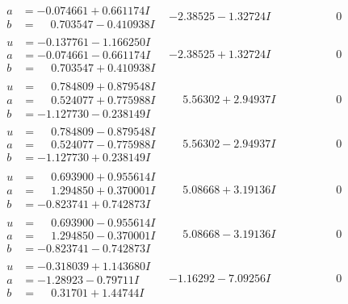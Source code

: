 \documentclass[1p]{elsarticle_modified}
\theoremstyle{definition}
\begin{document}
$$\begin{array}{c|c|c}
\begin{aligned}
a &= -0.074661 + 0.661174 I \\
b &= \phantom{-}0.703547 - 0.410938 I\end{aligned}
 & -2.38525 - 1.32724 I & \phantom{-0.000000 } 0 \\ \hline\begin{aligned}
u &= -0.137761 - 1.166250 I \\
a &= -0.074661 - 0.661174 I \\
b &= \phantom{-}0.703547 + 0.410938 I\end{aligned}
 & -2.38525 + 1.32724 I & \phantom{-0.000000 } 0 \\ \hline\begin{aligned}
u &= \phantom{-}0.784809 + 0.879548 I \\
a &= \phantom{-}0.524077 + 0.775988 I \\
b &= -1.127730 - 0.238149 I\end{aligned}
 & \phantom{-}5.56302 + 2.94937 I & \phantom{-0.000000 } 0 \\ \hline\begin{aligned}
u &= \phantom{-}0.784809 - 0.879548 I \\
a &= \phantom{-}0.524077 - 0.775988 I \\
b &= -1.127730 + 0.238149 I\end{aligned}
 & \phantom{-}5.56302 - 2.94937 I & \phantom{-0.000000 } 0 \\ \hline\begin{aligned}
u &= \phantom{-}0.693900 + 0.955614 I \\
a &= \phantom{-}1.294850 + 0.370001 I \\
b &= -0.823741 + 0.742873 I\end{aligned}
 & \phantom{-}5.08668 + 3.19136 I & \phantom{-0.000000 } 0 \\ \hline\begin{aligned}
u &= \phantom{-}0.693900 - 0.955614 I \\
a &= \phantom{-}1.294850 - 0.370001 I \\
b &= -0.823741 - 0.742873 I\end{aligned}
 & \phantom{-}5.08668 - 3.19136 I & \phantom{-0.000000 } 0 \\ \hline\begin{aligned}
u &= -0.318039 + 1.143680 I \\
a &= -1.28923 - 0.79711 I \\
b &= \phantom{-}0.31701 + 1.44744 I\end{aligned}
 & -1.16292 - 7.09256 I & \phantom{-0.000000 } 0 \\ \hline\begin{aligned}

\end{aligned}
\end{array}$$
\end{document}
